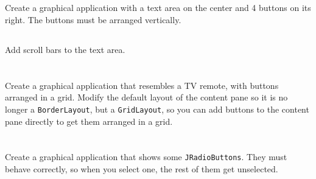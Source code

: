 \documentclass[a4paper, 11pt]{article}
\begin{document}
\subsection{}

Create a graphical application with a text area on the center and 4 buttons
on its right. The buttons must be arranged vertically.

\subsection{}

Add scroll bars to the text area.

\section{}

\subsection{}

Create a graphical application that resembles a TV remote, with buttons
arranged in a grid. Modify the default layout of the content pane so it is no
longer a \verb+BorderLayout+, but a \verb+GridLayout+, so you can add buttons
to the content pane directly to get them arranged in a grid.


\section{}

\subsection{}

Create a graphical application that shows some \verb+JRadioButtons+. They must
behave correctly, so when you select one, the rest of them get unselected.
\end{document}
